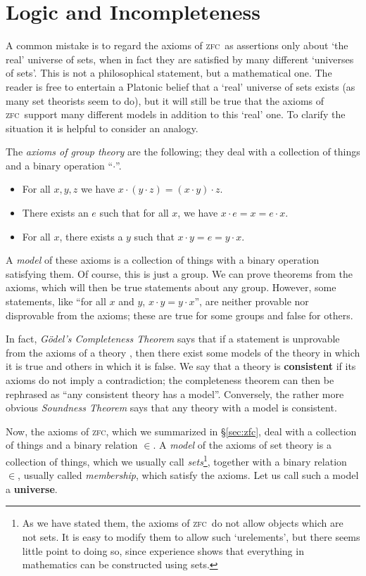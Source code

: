 \documentclass[12pt]{amsart}
\def\zfc{\textsc{zfc}}
\begin{document}
\section{Logic and Incompleteness}
\label{sec:logic}

A common mistake is to regard the axioms of \zfc\ as assertions only
about `the real' universe of sets, when in fact they are satisfied by
many different `universes of sets'.  This is not a philosophical
statement, but a mathematical one.  The reader is free to entertain a
Platonic belief that a `real' universe of sets exists (as many set
theorists seem to do), but it will still be true that the axioms of
\zfc\ support many different models in addition to this `real' one.  To
clarify the situation it is helpful to consider an analogy.

The \emph{axioms of group theory} are the following; they deal with a
collection of things and a binary operation ``$\cdot$''.
\begin{itemize}
\item For all $x,y,z$ we have $x\cdot (y\cdot z)=(x\cdot y)\cdot z$.
\item There exists an $e$ such that for all $x$, we have $x\cdot e = x
  = e\cdot x$.
\item For all $x$, there exists a $y$ such that $x\cdot y = e = y\cdot
  x$.
\end{itemize}
A \emph{model} of these axioms is a collection of things with a binary
operation satisfying them.  Of course, this is just a group.  We can
prove theorems from the axioms, which will then be true statements
about any group.  However, some statements, like ``for all $x$ and
$y$, $x\cdot y = y\cdot x$'', are neither provable nor disprovable
from the axioms; these are true for some groups and false for others.

In fact, \emph{G\"odel's Completeness Theorem} says that if a
statement is unprovable from the axioms of a theory \cT, then there
exist some models of the theory in which it is true and others in
which it is false.  We say that a theory is \textbf{consistent} if its
axioms do not imply a contradiction; the completeness theorem can then
be rephrased as ``any consistent theory has a model''.  Conversely,
the rather more obvious \emph{Soundness Theorem} says that any theory
with a model is consistent.

Now, the axioms of \zfc, which we summarized in \S\ref{sec:zfc}, deal
with a collection of things and a binary relation $\in$.  A
\emph{model} of the axioms of set theory is a collection of things,
which we usually call \emph{sets}\footnote{As we have stated them, the
  axioms of \zfc\ do not allow objects which are not sets.  It is easy
  to modify them to allow such `urelements', but there seems little
  point to doing so, since experience shows that everything in
  mathematics can be constructed using sets.}, together with a binary
relation $\in$, usually called \emph{membership}, which satisfy the
axioms.  Let us call such a model a \textbf{universe}.
\end{document}
